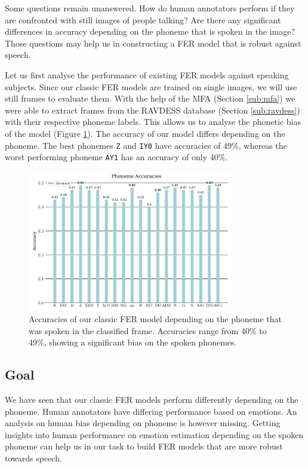 Some questions remain unanswered. How do human annotators perform if they are confronted with still images of people talking? Are there any significant differences in accuracy depending on the phoneme that is spoken in the image? Those questions may help us in constructing a FER model that is robust against speech. 

Let us first analyse the performance of existing FER models against speaking subjects. Since our classic FER models are trained on single images, we will use still frames to evaluate them. With the help of the MFA (Section \ref{sub:mfa}) we were able to extract frames from the RAVDESS database (Section \ref{sub:ravdess}) with their respective phoneme labels. This allows us to analyse the phonetic bias of the model (Figure \ref{fig:phone_acc_ravdess}). The accuracy of our model differs depending on the phoneme. The best phonemes \texttt{Z} and \texttt{IY0} have accuracies of 49\%, whereas the worst performing phoneme \texttt{AY1} has an accuracy of only 40\%.

\begin{figure}
    \centering
    \includegraphics[width=0.8\textwidth]{res/phone_acc_model.png}
    \caption{Accuracies of our classic FER model depending on the phoneme that was spoken in the classified frame. Accuracies range from 40\% to 49\%, showing a significant bias on the spoken phonemes.}
    \label{fig:phone_acc_ravdess}
\end{figure}
\subsection{Goal}
We have seen that our classic FER models perform differently depending on the phoneme. Human annotators have differing performance based on emotions. An analysis on human bias depending on phoneme is however missing. Getting insights into human performance on emotion estimation depending on the spoken phoneme can help us in our task to build FER models that are more robust towards speech.

